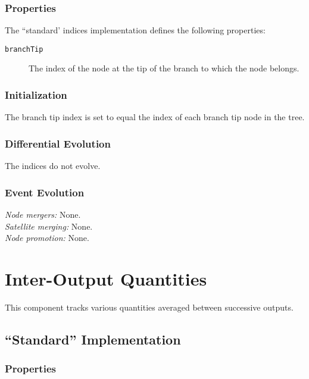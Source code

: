\subsubsection{Properties}

The ``standard' indices implementation defines the following properties:
\begin{description}
 \item [{\tt branchTip}] The index of the node at the tip of the branch to which the node belongs.
\end{description}

\subsubsection{Initialization}

The branch tip index is set to equal the index of each branch tip node in the tree.

\subsubsection{Differential Evolution}

The indices do not evolve.

\subsubsection{Event Evolution}

\noindent\emph{Node mergers:} None.\\

\noindent\emph{Satellite merging:} None.\\

\noindent\emph{Node promotion:} None.\\

\section{Inter-Output Quantities}\label{sec:ComponentInterOutput}

This \gls{component} tracks various quantities averaged between successive outputs.

\subsection{``Standard'' Implementation}

\subsubsection{Properties}

